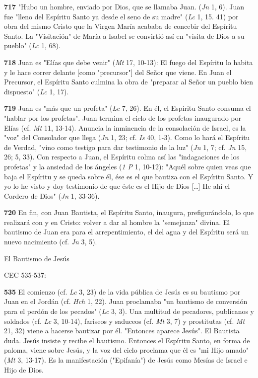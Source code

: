 \documentclass[]{article}
\begin{document}
\textbf{717} "Hubo un hombre, enviado por Dios, que se llamaba Juan.
(\emph{Jn} 1, 6). Juan fue "lleno del Espíritu Santo ya desde el seno de
su madre" (\emph{Lc} 1, 15. 41) por obra del mismo Cristo que la Virgen
María acababa de concebir del Espíritu Santo. La "Visitación" de María a
Isabel se convirtió así en "visita de Dios a su pueblo" (\emph{Lc} 1,
68).

\textbf{718} Juan es "Elías que debe venir" (\emph{Mt} 17, 10-13): El
fuego del Espíritu lo habita y le hace correr delante {[}como
"precursor"{]} del Señor que viene. En Juan el Precursor, el Espíritu
Santo culmina la obra de "preparar al Señor un pueblo bien dispuesto"
(\emph{Lc} 1, 17).

\textbf{719} Juan es "más que un profeta" (\emph{Lc} 7, 26). En él, el
Espíritu Santo consuma el "hablar por los profetas". Juan termina el
ciclo de los profetas inaugurado por Elías (cf. \emph{Mt} 11, 13-14).
Anuncia la inminencia de la consolación de Israel, es la "voz" del
Consolador que llega (\emph{Jn} 1, 23; cf. \emph{Is} 40, 1-3). Como lo
hará el Espíritu de Verdad, "vino como testigo para dar testimonio de la
luz" (\emph{Jn} 1, 7; cf. \emph{Jn} 15, 26; 5, 33). Con respecto a Juan,
el Espíritu colma así las "indagaciones de los profetas" y la ansiedad
de los ángeles (\emph{1 P} 1, 10-12): "Aquél sobre quien veas que baja
el Espíritu y se queda sobre él, ése es el que bautiza con el Espíritu
Santo. Y yo lo he visto y doy testimonio de que éste es el Hijo de Dios
[\ldots{}] He ahí el Cordero de Dios" (\emph{Jn} 1, 33-36).

\textbf{720} En fin, con Juan Bautista, el Espíritu Santo, inaugura,
prefigurándolo, lo que realizará con y en Cristo: volver a dar al hombre
la "semejanza" divina. El bautismo de Juan era para el arrepentimiento,
el del agua y del Espíritu será un nuevo nacimiento (cf. \emph{Jn} 3,
5).

El Bautismo de Jesús

CEC 535-537:

\textbf{535} El comienzo (cf. \emph{Lc} 3, 23) de la vida pública de
Jesús es su bautismo por Juan en el Jordán (cf. \emph{Hch} 1, 22). Juan
proclamaba "un bautismo de conversión para el perdón de los pecados"
(\emph{Lc} 3, 3). Una multitud de pecadores, publicanos y soldados (cf.
\emph{Lc} 3, 10-14), fariseos y saduceos (cf. \emph{Mt} 3, 7) y
prostitutas (cf. \emph{Mt} 21, 32) viene a hacerse bautizar por él.
"Entonces aparece Jesús". El Bautista duda. Jesús insiste y recibe el
bautismo. Entonces el Espíritu Santo, en forma de paloma, viene sobre
Jesús, y la voz del cielo proclama que él es "mi Hijo amado" (\emph{Mt}
3, 13-17). Es la manifestación ("Epifanía") de Jesús como Mesías de
Israel e Hijo de Dios.
\end{document}
